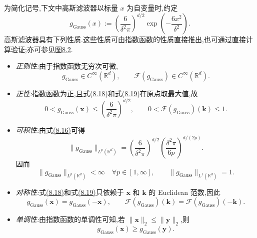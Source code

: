 \begin{example}[高斯滤波器]
为简化记号,下文中高斯滤波器以标量 $x$ 为自变量时,约定
\[
 g_{\mathrm{Gauss}}(x)
  :=\left(\frac{6}{\delta^2\pi}\right)^{d/2}
    \exp\!\left(-\frac{6x^2}{\delta^2}\right).
\]
高斯滤波器具有下列性质.这些性质可由指数函数的性质直接推出,也可通过直接计算验证;亦可参见图\hyperref[fig:gaussian-filter]{8.2}.
\begin{itemize}
 \item \textit{正则性:}由于指数函数无穷次可微,
 \[
  g_{\mathrm{Gauss}}\in C^\infty(\mathbb{R}^d),
  \qquad
  \mathcal{F}(g_{\mathrm{Gauss}})\in C^\infty(\mathbb{R}^d).
 \]
 \item \textit{正性:}指数函数为正,且式\hyperref[eq:gaussian-filter-d-dimensional]{(8.18)}和式\hyperref[eq:gaussian-filter-fourier]{(8.19)}在原点取最大值,故
 \begin{equation}\label{eq:gaussian-filter-positivity}
  0<g_{\mathrm{Gauss}}(\bm{x})
    \le\left(\frac{6}{\delta^2\pi}\right)^{d/2},
  \qquad
  0<\mathcal{F}(g_{\mathrm{Gauss}})(\bm{k})\le1.
 \end{equation}
 \item \textit{可积性:}由式\hyperref[eq:gaussian-integral]{(8.16)}可得
 \[
  \|g_{\mathrm{Gauss}}\|_{L^p(\mathbb{R}^d)}
   =\left(\frac{6}{\delta^2\pi}\right)^{d/2}
    \left(\frac{\delta^2\pi}{6p}\right)^{d/(2p)}.
 \]
 因而
 \begin{equation}\label{eq:gaussian-filter-integrability}
  \|g_{\mathrm{Gauss}}\|_{L^p(\mathbb{R}^d)}<\infty
   \quad\forall p\in[1,\infty],
  \qquad
  \|g_{\mathrm{Gauss}}\|_{L^1(\mathbb{R}^d)}=1.
 \end{equation}
 \item \textit{对称性:}式\hyperref[eq:gaussian-filter-d-dimensional]{(8.18)}和式\hyperref[eq:gaussian-filter-fourier]{(8.19)}只依赖于 $\bm{x}$ 和 $\bm{k}$ 的 Euclidean 范数,因此
 \begin{equation}\label{eq:gaussian-filter-symmetry}
  g_{\mathrm{Gauss}}(\bm{x})=g_{\mathrm{Gauss}}(-\bm{x}),
  \qquad
  \mathcal{F}(g_{\mathrm{Gauss}})(\bm{k})
   =\mathcal{F}(g_{\mathrm{Gauss}})(-\bm{k}).
 \end{equation}
 \item \textit{单调性:}由指数函数的单调性可知,若 $\|\bm{x}\|_2\le\|\bm{y}\|_2$,则
 \begin{equation}\label{eq:gaussian-filter-monotonicity}
  g_{\mathrm{Gauss}}(\bm{x})\ge g_{\mathrm{Gauss}}(\bm{y}).
 \end{equation}
\end{itemize}
\end{example}

